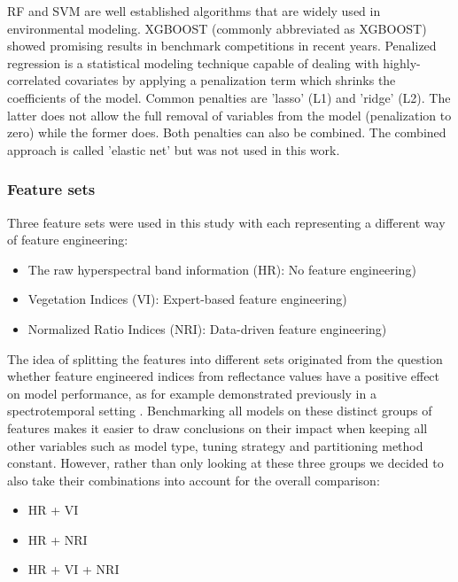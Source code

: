 \documentclass[letterpaper, peerreview]{IEEEtran}
\begin{document}
\noindent \ac{RF} and {SVM} are well established algorithms that are widely used in environmental modeling.
\ac{XGBOOST} (commonly abbreviated as XGBOOST) showed promising results in benchmark competitions in recent years.
Penalized regression is a statistical modeling technique capable of dealing with highly-correlated covariates by applying a penalization term which shrinks the coefficients of the model\cite{hastie2001}.
Common penalties are 'lasso' (L1) and 'ridge' (L2).
The latter does not allow the full removal of variables from the model (penalization to zero) while the former does.
Both penalties can also be combined.
The combined approach is called 'elastic net' but was not used in this work.

\subsubsection{Feature sets}

\noindent Three feature sets were used in this study with each representing a different way of feature engineering:

\begin{itemize}
	\item The raw hyperspectral band information (HR): No feature engineering) %
	\item Vegetation Indices (\ac{VI}): Expert-based feature engineering)
	\item Normalized Ratio Indices (\ac{NRI}): Data-driven feature engineering)
\end{itemize}

The idea of splitting the features into different sets originated from the question whether feature engineered indices from reflectance values have a positive effect on model performance, as for example demonstrated previously in a spectrotemporal setting \cite{pena2017}.
Benchmarking all models on these distinct groups of features makes it easier to draw conclusions on their impact when keeping all other variables such as model type, tuning strategy and partitioning method constant.
However, rather than only looking at these three groups we decided to also take their combinations into account for the overall comparison:

\begin{itemize}
	\item HR + VI %
	\item HR + NRI
	\item HR + VI + NRI
\end{itemize}
\end{document}
